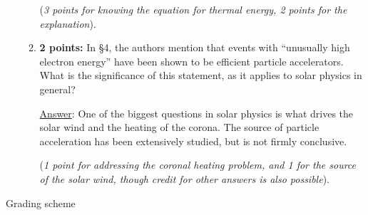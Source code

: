 \documentclass[12pt]{article}
\begin{document}
\begin{enumerate}
\begin{enumerate}
{                    (\emph{3 points for knowing the equation for thermal energy,
                        2 points for the explanation}).}

            \item \textbf{2 points:} In \S 4, the authors mention that events with ``unusually
                high electron energy'' have been shown to be efficient particle
                accelerators. What is the significance of this statement,
                as it applies to solar physics in general?

                {\small \underline{Answer}: One of the biggest questions in
                solar physics is what drives the solar wind and
                the heating of the corona. The source of particle acceleration
                has been extensively studied, but is not firmly conclusive.

                (\emph{1 point for addressing the coronal heating problem, and 1
                for the source of the solar wind, though credit for other answers
                is also possible}).}
        \end{enumerate}
\end{enumerate}

\newpage
Grading scheme
\end{document}
